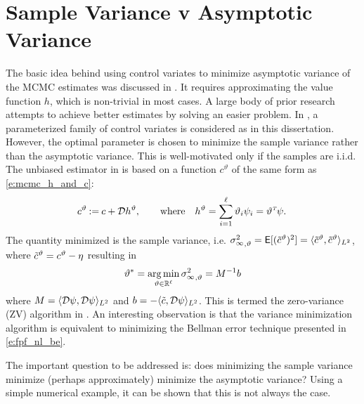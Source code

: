 \section{Sample Variance v Asymptotic Variance}
\label{s:mcmc_var_vs_asym_var}
The basic idea behind using control variates to minimize asymptotic variance of the MCMC estimates was discussed in . It requires approximating the value function $h$, which is non-trivial in most cases. A large body of prior research \cite{mirsolimp13, oatgircho,papmirgir14} attempts to achieve better estimates by solving an easier problem. In \cite{papmirgir14}, a parameterized family of control variates is considered as in this dissertation. However, the optimal parameter is chosen to minimize the sample variance rather than the asymptotic variance. This is well-motivated only  if the samples are i.i.d. 
The unbiased estimator in \cite{papmirgir14} is based on a function $c^{\vartheta}$ of the same form as \eqref{e:mcmc_h_and_c}:
\[
\begin{aligned}
c^\vartheta  \mathbin{:=} c + {\cal D} h^\vartheta,
\qquad
\text{where}
\quad
h^\vartheta  =  \sum_{i=1}^\ell \vartheta_i \psi_i = \vartheta^{\hbox{\tiny\it T}} \psi.\,
\end{aligned}
\]
The quantity minimized is the sample variance, i.e. ${\sigma^2_\infty}_{,\vartheta} = {\sf E}[(\tilde c^\vartheta)^2] = \langle \tilde c^\vartheta, \tilde c^\vartheta \rangle_{L^2}$, where $\tilde c^\vartheta = c^\vartheta - \eta$ resulting in
\begin{equation}
\vartheta^*= \argmin_{\vartheta \in \Re^\ell} {\asymvar}_{,\vartheta}  = M^{-1} b
\label{e:mcmc_var_theta_star}
\end{equation}
where $M = \langle {\cal D} \psi,  {\cal D} \psi \rangle_{L^2}$ and $b = - \langle \tilde c, {\cal D} \psi \rangle_{L^2}$. This is termed the zero-variance (ZV) algorithm in \cite{papmirgir14}. An interesting observation is that the variance minimization algorithm is equivalent to minimizing the Bellman error technique presented in \eqref{e:fpf_nl_be}.

The important question to be addressed is: does minimizing the sample variance minimize (perhaps approximately) minimize the asymptotic variance? Using a simple numerical example, it can be shown that this is not always the case.

